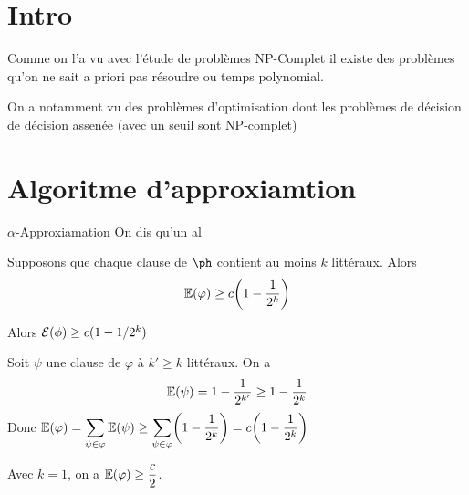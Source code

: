 \documentclass[a4paper,french,bookmarks]{article}
\begin{document}
    \renewcommand{\thesection}{\Roman{section}} 
    \renewcommand{\thesubsection}{\thesection.\Alph{subsection}}
    \renewcommand{\labelenumi}{\thesection.\arabic{enumi}.}
    \renewcommand*{\labelenumii}{\alph{enumii}.}
    \renewcommand*{\labelenumiii}{\alph{enumiii}.}
    
    \def\authorvar{DRISSI Rayan}
    \section{Intro}
    
    Comme on l'a vu avec l'étude de problèmes NP-Complet il existe des problèmes qu'on ne sait a priori pas résoudre ou temps polynomial. 

    On a notamment vu des problèmes d'optimisation dont les problèmes de décision de décision assenée (avec un seuil sont NP-complet)

    \section{Algoritme d'approxiamtion}

    \begin{definition}{$\alpha$-Approxiamation}{}
        On dis qu'un al 
    \end{definition}


    \begin{property}{}{}
        Supposons que chaque clause de $\ph$ contient au moins 
        $k$ littéraux. Alors
        \[\mathbb{E}\!\left(\varphi\right) \geq c\!\left(1 - \dfrac{1}{2^k}\right) \]

        Alors $\mathcal{E}(\phi) \geq c(1 - 1/2^k) $
    \end{property}
    
    \begin{nproof}
        Soit $\psi$ une clause de $\varphi$ à $k' \geq k$ littéraux. On a 
        \[ \mathbb{E}\!\left(\psi\right) = 1 - \dfrac{1}{2^{k'}} \geq 1 - \dfrac{1}{2^k}\]
        Donc $\mathbb{E}\!\left(\varphi\right) = \displaystyle\sum_{\psi \in \varphi} \mathbb{E}\!\left(\psi\right) \geq \sum_{\psi \in \varphi} \!\left(1 - \dfrac{1}{2^k}\right) = c\!\left(1 - \dfrac{1}{2^k}\right)$
    \end{nproof}
    
    \begin{corollary}{}{}
        Avec $k = 1$, on a $\mathbb{E}\!\left(\varphi\right) \geq \dfrac{c}{2}$.
    \end{corollary}
\end{document}
